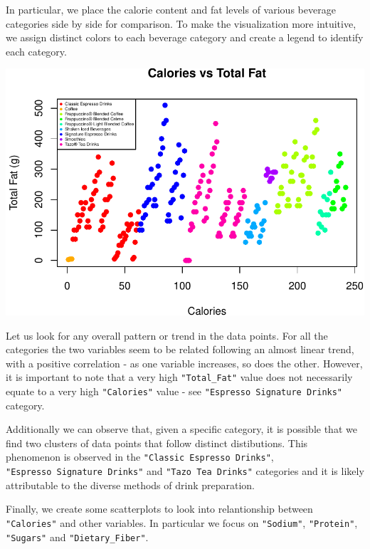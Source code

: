 \documentclass[
]{article}
\begin{document}
In particular, we place the calorie content and fat levels of various
beverage categories side by side for comparison. To make the
visualization more intuitive, we assign distinct colors to each beverage
category and create a legend to identify each category.

\begin{center}\includegraphics{Statistical_Learning_Final_Report_files/figure-latex/fat_comparison-1} \end{center}

Let us look for any overall pattern or trend in the data points. For all
the categories the two variables seem to be related following an almost
linear trend, with a positive correlation - as one variable increases,
so does the other. However, it is important to note that a very high
\texttt{"Total\_Fat"} value does not necessarily equate to a very high
\texttt{"Calories"} value - see \texttt{"Espresso\ Signature\ Drinks"}
category.

Additionally we can observe that, given a specific category, it is
possible that we find two clusters of data points that follow distinct
distibutions. This phenomenon is observed in the
\texttt{"Classic\ Espresso\ Drinks"},
\texttt{"Espresso\ Signature\ Drinks"} and \texttt{"Tazo\ Tea\ Drinks"}
categories and it is likely attributable to the diverse methods of drink
preparation.

Finally, we create some scatterplots to look into relantionship between
\texttt{"Calories"} and other variables. In particular we focus on
\texttt{"Sodium"}, \texttt{"Protein"}, \texttt{"Sugars"} and
\texttt{"Dietary\_Fiber"}.
\end{document}
